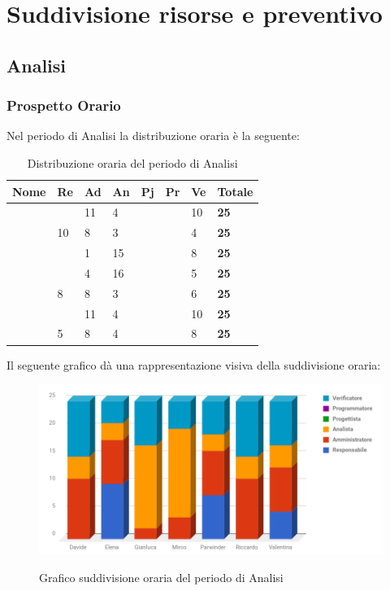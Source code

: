 \documentclass[PianoDiProgetto.tex]{subfiles}
\begin{document}
\chapter{Suddivisione risorse e preventivo}
\section{Analisi}
\subsection{Prospetto Orario}
Nel periodo di Analisi la distribuzione oraria è la seguente:
\begin{center}
\begin{table}[htbp]
	\centering
	\renewcommand\arraystretch{1.5}
	\begin{tabularx}{\textwidth}{p{4cm}|p{1cm}|p{1cm}|p{1cm}|p{1cm}|p{1cm}|p{1cm}|p{2cm}}
		\hline
		\textbf{Nome} & \textbf{Re} & \textbf{Ad} & \textbf{An} & \textbf{Pj} & \textbf{Pr} & \textbf{Ve} & \textbf{Totale} \\
		\hline
		\Davide & \ & 11 & 4 & \ & \ & 10 & \textbf{25} \\
		\hline
		\Elena & 10 & 8 & 3 & \ & \ & 4 & \textbf{25} \\
		\hline
		\Gianluca & \ & 1 & 15 & \ & \ & 8 & \textbf{25} \\
		\hline
		\Mirco & \ & 4 & 16 & \ & \ & 5 & \textbf{25} \\
		\hline
		\Parwinder & 8 & 8 & 3 & \ & \ & 6 & \textbf{25} \\
		\hline
		\Riccardo & \ & 11 & 4 & \ & \ & 10 & \textbf{25} \\
		\hline
		\Valentina & 5 & 8 & 4 & \ & \ & 8 & \textbf{25} \\
		\hline
	\end{tabularx}
	\caption{Distribuzione oraria del periodo di Analisi}
	\label{my-label}
\end{table} 
\newpage	
\end{center}
Il seguente grafico dà una rappresentazione visiva della suddivisione oraria:
\begin{figure}[h]
	\includegraphics[width=14.5cm]{images/prospettoOrario/analisi.png}
	\label{fig:foo}
	\caption{Grafico suddivisione oraria del periodo di Analisi}
\end{figure} 
\end{document}
